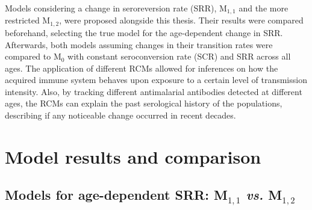 Models considering a change in seroreversion rate (SRR), M$_{1,1}$ and the more restricted M$_{1,2}$, were proposed alongside this thesis.
Their results were compared beforehand, selecting the true model for the age-dependent change in SRR.
Afterwards, both models assuming changes in their transition rates were compared to M$_0$ with constant seroconversion rate (SCR) and SRR across all ages.
The application of different RCMs allowed for inferences on how the acquired immune system behaves upon exposure to a certain level of transmission intensity.
Also, by tracking different antimalarial antibodies detected at different ages, the RCMs can explain the past serological history of the populations, describing if any noticeable change occurred in recent decades.

\section{Model results and comparison}
\subsection[Models for age-dependent seroreversion rate]{Models for age-dependent SRR: M$_{1,1}$ \textit{vs.} M$_{1,2}$}

